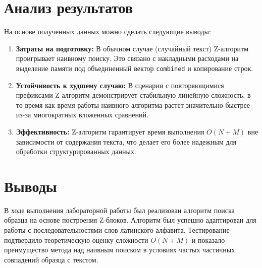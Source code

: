 \documentclass[unicode, 12pt, a4paper,oneside,fleqn]{article}
\begin{document}
\section{Анализ результатов}
На основе полученных данных можно сделать следующие выводы:
\begin{enumerate}
    \item \textbf{Затраты на подготовку:} В обычном случае (случайный текст) Z-алгоритм проигрывает наивному поиску. Это связано с накладными расходами на выделение памяти под объединенный вектор \texttt{combined} и копирование строк.
    \item \textbf{Устойчивость к худшему случаю:} В сценарии с повторяющимися префиксами Z-алгоритм демонстрирует стабильную линейную сложность, в то время как время работы наивного алгоритма растет значительно быстрее из-за многократных вложенных сравнений.
    \item \textbf{Эффективность:} Z-алгоритм гарантирует время выполнения $O(N+M)$ вне зависимости от содержания текста, что делает его более надежным для обработки структурированных данных.
\end{enumerate}

\pagebreak

\section{Выводы}
В ходе выполнения лабораторной работы был реализован алгоритм поиска образца на основе построения Z-блоков. Алгоритм был успешно адаптирован для работы с последовательностями слов латинского алфавита. Тестирование подтвердило теоретическую оценку сложности $O(N + M)$ и показало преимущество метода над наивным поиском в условиях частых частичных совпадений образца с текстом.

\pagebreak


\end{document}
